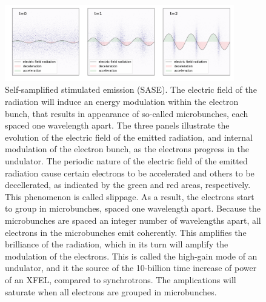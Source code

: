 \begin{figure}[h]
\centering
\includegraphics[width=100mm]{Chapter_03_GenerationXrayXFEL_microbunching.png}
\caption{Self-samplified stimulated emission (SASE). The electric field of the radiation will induce an energy modulation within the electron bunch, that results in appearance of so-called microbunches, each spaced one wavelength apart. The three panels illustrate the evolution of the electric field of the emitted radiation, and internal modulation of the electron bunch, as the electrons progress in the undulator. The periodic nature of the electric field of the emitted radiation cause certain electrons to be accelerated and others to be decellerated, as indicated by the green and red areas, respectively. This phenomenon is called slippage. As a result, the electrons start to group in microbunches, spaced one wavelength apart. Because the microbunches are spaced an integer number of wavelengths apart, all electrons in the microbunches emit coherently. This amplifies the brilliance of the radiation, which in its turn will amplify the modulation of the electrons. This is called the high-gain mode of an undulator, and it the source of the 10-billion time increase of power of an XFEL, compared to synchrotrons. The amplications will saturate when all electrons are grouped in microbunches.}\label{fig:microbunching}
\end{figure}